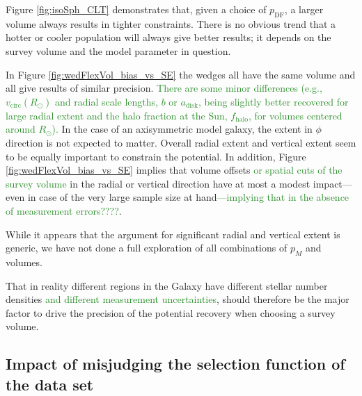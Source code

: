 \documentclass[iop,revtex4]{emulateapj}
\newcommand{\pmodel}{\ensuremath{p_M}}
\newcommand{\NEW}[1]{\textcolor{ForestGreen}{#1}}
\newcommand{\OLD}[1]{}
\begin{document}
Figure \ref{fig:isoSph_CLT} demonstrates that, given a choice of $p_\text{DF}$, a larger volume always results in tighter constraints. There is no obvious trend that a hotter or cooler population will always give better results; it depends on the survey volume and the model parameter in question.

In Figure \ref{fig:wedFlexVol_bias_vs_SE} the wedges all have the same volume and all give results of similar precision. \OLD{Minor differences (e.g., the \texttt{Iso-Pot} potential being less constrained in the wedge with large vertical but small radial extent) are a special property of the considered potential and parameters, and not a global property of the corresponding survey volume.}\NEW{There are some minor differences (e.g., $v_\text{circ}(R_\odot)$ and radial scale lengths, $b$ or $a_\text{disk}$, being slightly better recovered for large radial extent and the halo fraction at the Sun, $f_\text{halo}$, for volumes centered around $R_\odot$).} In the case of an axisymmetric model galaxy, the extent in $\phi$ direction is not expected to matter. Overall radial extent and vertical extent seem to be equally important to constrain the potential. In addition, Figure \ref{fig:wedFlexVol_bias_vs_SE} implies that volume offsets \NEW{or spatial cuts of the survey volume} in the radial or vertical direction have at most a modest impact---even in case of the very large sample size at hand\NEW{---implying that in the absence of measurement errors????}.

While it appears that the argument for significant radial and vertical extent is generic, we have not done a full exploration of all combinations of \pmodel{} and volumes.

That in reality different regions in the Galaxy have different stellar number densities\NEW{ and different measurement uncertainties}, should therefore be the major factor to drive the precision of the potential recovery when choosing a survey volume.

\subsection{Impact of misjudging the selection function of the data set} \label{sec:results_incompR}
\end{document}
